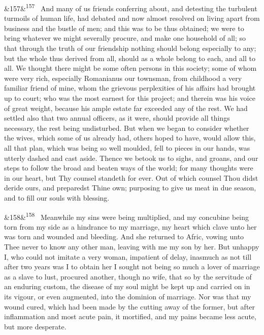 \documentclass[12pt]{article}
\newcommand{\para}[1][]{\par\noindent\ifx&#1&\else\textsuperscript{\footnotesize #1}~\fi}
\begin{document}
\para[157] And many of us friends conferring about, and detesting the turbulent turmoils of human life, had debated and now almost resolved on living apart from business and the bustle of men; and this was to be thus obtained; we were to bring whatever we might severally procure, and make one household of all; so that through the truth of our friendship nothing should belong especially to any; but the whole thus derived from all, should as a whole belong to each, and all to all. We thought there might be some often persons in this society; some of whom were very rich, especially Romanianus our townsman, from childhood a very familiar friend of mine, whom the grievous perplexities of his affairs had brought up to court; who was the most earnest for this project; and therein was his voice of great weight, because his ample estate far exceeded any of the rest. We had settled also that two annual officers, as it were, should provide all things necessary, the rest being undisturbed. But when we began to consider whether the wives, which some of us already had, others hoped to have, would allow this, all that plan, which was being so well moulded, fell to pieces in our hands, was utterly dashed and cast aside. Thence we betook us to sighs, and groans, and our steps to follow the broad and beaten ways of the world; for many thoughts were in our heart, but Thy counsel standeth for ever. Out of which counsel Thou didst deride ours, and preparedst Thine own; purposing to give us meat in due season, and to fill our souls with blessing.

\para[158] Meanwhile my sins were being multiplied, and my concubine being torn from my side as a hindrance to my marriage, my heart which clave unto her was torn and wounded and bleeding. And she returned to Afric, vowing unto Thee never to know any other man, leaving with me my son by her. But unhappy I, who could not imitate a very woman, impatient of delay, inasmuch as not till after two years was I to obtain her I sought not being so much a lover of marriage as a slave to lust, procured another, though no wife, that so by the servitude of an enduring custom, the disease of my soul might be kept up and carried on in its vigour, or even augmented, into the dominion of marriage. Nor was that my wound cured, which had been made by the cutting away of the former, but after inflammation and most acute pain, it mortified, and my pains became less acute, but more desperate.
\end{document}
